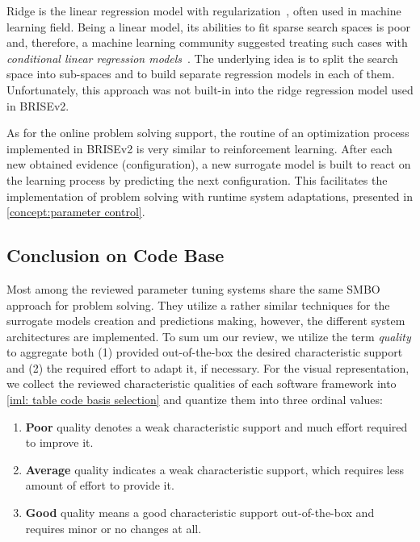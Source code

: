 Ridge is the linear regression model with regularization~\cite{hoerl1970ridge}, often used in machine learning field. Being a linear model, its abilities to fit sparse search spaces is poor and, therefore, a machine learning community suggested treating such cases with \emph{conditional linear regression models}~\cite{DBLP:journals/corr/abs-1806-02326}. The underlying idea is to split the search space into sub-spaces and to build separate regression models in each of them. Unfortunately, this approach was not built-in into the ridge regression model used in BRISEv2.

As for the online problem solving support, the routine of an optimization process implemented in BRISEv2 is very similar to reinforcement learning. After each new obtained evidence (configuration), a new surrogate model is built to react on the learning process by predicting the next configuration. This facilitates the implementation of problem solving with runtime system adaptations, presented in \cref{concept:parameter control}.

\subsection{Conclusion on Code Base}\label{impl:hlh code basis conclusion}
Most among the reviewed parameter tuning systems share the same SMBO approach for problem solving. They utilize a rather similar techniques for the surrogate models creation and predictions making, however, the different system architectures are implemented. To sum um our review, we utilize the term \emph{quality} to aggregate both (1) provided out-of-the-box the desired characteristic support and (2) the required effort to adapt it, if necessary. For the visual representation, we collect the reviewed characteristic qualities of each software framework into \cref{iml: table code basis selection} and quantize them into three ordinal values:
\begin{enumerate}
	\item \textbf{Poor} quality denotes a weak characteristic support and much effort required to improve it.
	\item \textbf{Average} quality indicates a weak characteristic support, which requires less amount of effort to provide it.
	\item \textbf{Good} quality means a good characteristic support out-of-the-box and requires minor or no changes at all.
\end{enumerate}

